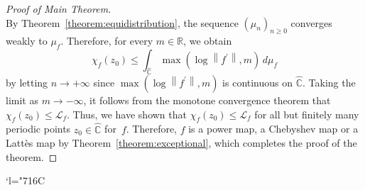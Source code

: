 \documentclass[11pt]{article}
\newcommand{\Changelback}{\mathcode`l="716C}
\theoremstyle{plain}
\theoremstyle{definition}
\theoremstyle{remark}
\begin{document}
\begin{proof}[Proof of Main Theorem]
\[\]
By Theorem~\ref{theorem:equidistribution}, the sequence $\left(\mu_{n} \right)_{n \geq 0}$ converges weakly to $\mu_{f}$. Therefore, for every $m \in \mathbb{R}$, we obtain
\[
\chi_{f}(z_{0}) \leq \int_{\widehat{\mathbb{C}}} \max\left(\log\left\lVert f^{\prime} \right\rVert, m \right) \, d\mu_{f}
\]
by letting $n \to +\infty$ since $\max\left(\log\left\lVert f^{\prime} \right\rVert, m \right)$ is continuous on $\widehat{\mathbb{C}}$. Taking the limit as $m \to -\infty$, it follows from the monotone convergence theorem that $\chi_{f}(z_{0}) \leq \mathcal{L}_{f}$. Thus, we have shown that $\chi_{f}(z_{0}) \leq \mathcal{L}_{f}$ for all but finitely many periodic points $z_{0} \in \widehat{\mathbb{C}}$ for~$f$. Therefore, $f$ is a power map, a Chebyshev map or a Lattès map by Theorem~\ref{theorem:exceptional}, which completes the proof of the theorem.
\end{proof}

\Changelback

\end{document}
